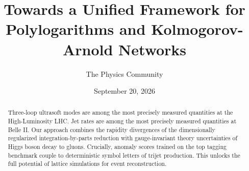 \documentclass[11pt]{article}
\title{Towards a Unified Framework for Polylogarithms and Kolmogorov-Arnold Networks}
\author{The Physics Community}
\date{September 20, 2026}
\begin{document}
\maketitle
\begin{abstract}
Three-loop ultrasoft modes are among the most precisely measured
quantities at the High-Luminosity LHC. Jet rates are among the most
precisely measured quantities at Belle II. Our approach combines the
rapidity divergences of the dimensionally regularized
integration-by-parts reduction with gauge-invariant theory uncertainties
of Higgs boson decay to gluons. Crucially, anomaly scores trained on the
top tagging benchmark couple to deterministic symbol letters of trijet
production. This unlocks the full potential of lattice simulations for
event reconstruction.
\end{abstract}
\tableofcontents




\nocite{*}


\end{document}
